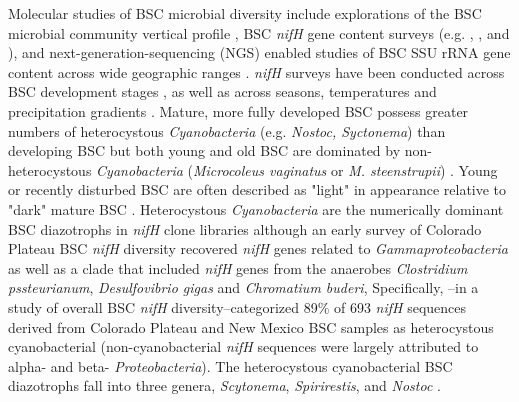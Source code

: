 Molecular studies of BSC microbial diversity include explorations of
the BSC microbial community vertical profile
\citep{Garcia_Pichel_2003}, BSC \textit{nifH} gene content surveys
(e.g. \citet{14766579}, \citet{Yeager_2012}, \citet{Yeager} and
\citet{Steppe_1996}), and next-generation-sequencing (NGS) enabled
studies of BSC SSU rRNA gene content across wide geographic ranges
\citep{Garcia_Pichel_2013, Steven_2013}. 
\textit{nifH} surveys have been conducted across BSC development stages
\citep{14766579}, as well as across seasons, temperatures and
precipitation gradients \citep{Yeager_2012}. Mature, more fully
developed BSC possess greater numbers of heterocystous
\textit{Cyanobacteria} (e.g. \textit{Nostoc, Syctonema}) than
developing BSC but both young and old BSC are dominated by
non-heterocystous \textit{Cyanobacteria} (\textit{Microcoleus
vaginatus} or \textit{M. steenstrupii}) \citep{14766579,
Garcia_Pichel_2013}. Young or recently disturbed BSC are often
described as "light" in appearance relative to "dark" mature BSC
\citep{Belnap_2002, 14766579}. Heterocystous \textit{Cyanobacteria} are
the numerically dominant BSC diazotrophs in \textit{nifH} clone
libraries \citep{Yeager, 14766579, Yeager_2012} although an early
survey of Colorado Plateau BSC \textit{nifH} diversity recovered
\textit{nifH} genes related to \textit{Gammaproteobacteria} as well as
a clade that included \textit{nifH} genes from the anaerobes
\textit{Clostridium pssteurianum}, \textit{Desulfovibrio gigas} and
\textit{Chromatium buderi}, Specifically, \citet{Yeager}--in a study of
overall BSC \textit{nifH} diversity--categorized 89\% of 693
\textit{nifH} sequences derived from Colorado Plateau and New Mexico
BSC samples as heterocystous cyanobacterial (non-cyanobacterial
\textit{nifH} sequences were largely attributed to alpha- and beta-
\textit{Proteobacteria}). The heterocystous cyanobacterial BSC
diazotrophs fall into three genera, \textit{Scytonema},
\textit{Spirirestis}, and \textit{Nostoc} \citep{Yeager, Yeager_2012}. 

